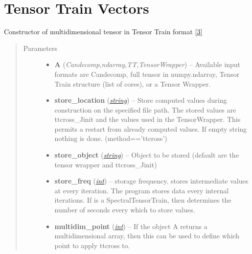\documentclass[a4paper,10pt,english]{sphinxmanual}
\begin{document}
\section{Tensor Train Vectors}
\label{api-ttvec:tensor-train-vectors}\label{api-ttvec::doc}\label{api-ttvec:module-TensorToolbox}

\begin{fulllineitems}
\label{api-ttvec:TensorToolbox.core.TTvec}
Constructor of multidimensional tensor in Tensor Train format {\hyperref[zrefs:oseledets2011]{{[}3{]}}}
\begin{quote}\begin{description}
\item[{Parameters}] \leavevmode\begin{itemize}
\item {} 
\textbf{A} (\emph{Candecomp,ndarray,TT,TensorWrapper}) -- Available input formats are Candecomp, full tensor in numpy.ndarray, Tensor Train structure (list of cores), or a Tensor Wrapper.

\item {} 
\textbf{store\_location} (\href{http://docs.python.org/library/string.html\#module-string}{\emph{string}}) -- Store computed values during construction on the specified file path. The stored values are ttcross\_Jinit and the values used in the TensorWrapper. This permits a restart from already computed values. If empty string nothing is done. (method=='ttcross')

\item {} 
\textbf{store\_object} (\href{http://docs.python.org/library/string.html\#module-string}{\emph{string}}) -- Object to be stored (default are the tensor wrapper and ttcross\_Jinit)

\item {} 
\textbf{store\_freq} (\href{http://docs.python.org/library/functions.html\#int}{\emph{int}}) -- storage frequency.  stores intermediate values at every iteration. The program stores data every  internal iterations. If  is a SpectralTensorTrain, then  determines the number of seconds every which to store values.

\item {} 
\textbf{multidim\_point} (\href{http://docs.python.org/library/functions.html\#int}{\emph{int}}) -- If the object A returns a multidimensional array, then this can be used to define which point to apply ttcross to.


\end{itemize}
\end{description}
\end{quote}
\end{fulllineitems}
\end{document}
